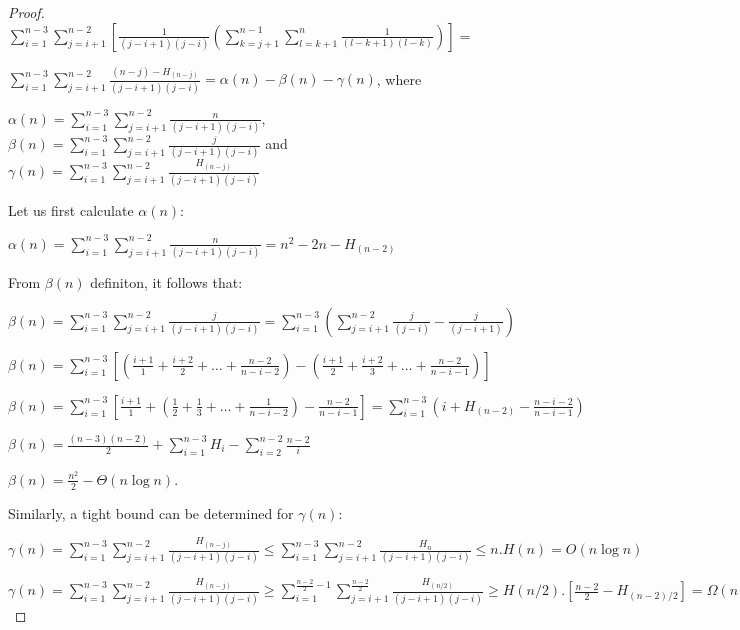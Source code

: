 \documentclass[12pt,letterpaper]{article}
\begin{document}
\begin{proof}
$\sum\limits_{i=1}^{n-3} \sum\limits_{j=i+1}^{n-2}  \left[ \frac{1}{(j-i+1)(j-i)}
\left( \sum\limits_{k=j+1}^{n-1} \sum\limits_{l=k+1}^{n} \frac{1}{(l-k+1)(l-k)} \right) \right] =  $

$\sum\limits_{i=1}^{n-3} \sum\limits_{j=i+1}^{n-2} \frac{(n - j) - H_{(n - j)}} {(j-i+1)(j-i)} 
= \alpha(n) - \beta(n) - \gamma(n)$, where

$\alpha(n) = \sum\limits_{i=1}^{n-3} \sum\limits_{j=i+1}^{n-2} \frac{n} {(j-i+1)(j-i)}$,
$\beta(n) = \sum\limits_{i=1}^{n-3} \sum\limits_{j=i+1}^{n-2} \frac{j} {(j-i+1)(j-i)}$ and 
$\gamma(n) =  \sum\limits_{i=1}^{n-3} \sum\limits_{j=i+1}^{n-2} \frac{H_{(n - j)}} {(j-i+1)(j-i)}$

Let us first calculate $\alpha(n)$:

$\alpha(n) = \sum\limits_{i=1}^{n-3} \sum\limits_{j=i+1}^{n-2} \frac{n} {(j-i+1)(j-i)}
= n^2 - 2n - H_{(n-2)}$

From $\beta(n)$ definiton, it follows that:

$\beta(n) = \sum\limits_{i=1}^{n-3} \sum\limits_{j=i+1}^{n-2} \frac{j} {(j-i+1)(j-i)}
= \sum\limits_{i=1}^{n-3} \left( \sum\limits_{j=i+1}^{n-2} \frac{j}{(j-i)} - \frac{j} {(j-i+1)} \right)$

$\beta(n) = \sum\limits_{i=1}^{n-3} \left[ \left( \frac{i+1}{1} +  \frac{i+2}{2} + \ldots + \frac{n-2}{n-i-2} \right)
- \left( \frac{i+1}{2} +  \frac{i+2}{3} + \ldots + \frac{n-2}{n-i-1} \right) \right]$

$\beta(n) = \sum\limits_{i=1}^{n-3} \left[
\frac{i+1}{1}  + \left( \frac{1}{2} +  \frac{1}{3} + \ldots + \frac{1}{n-i-2} \right)
- \frac{n-2}{n-i-1} \right]
= \sum\limits_{i=1}^{n-3} \left( i + H_{(n-2)} - \frac{n-i-2}{n-i-1} \right)$

$\beta(n) = \frac{(n-3)(n-2)}{2} + \sum\limits_{i=1}^{n-3} H_{i} - \sum\limits_{i=2}^{n-2} \frac{n-2}{i}$

$\beta(n) = \frac{n^2}{2} - \Theta(n \log n)$.

Similarly, a tight bound can be determined for $\gamma(n)$:

$\gamma(n) =  \sum\limits_{i=1}^{n-3} \sum\limits_{j=i+1}^{n-2} \frac{H_{(n - j)}} {(j-i+1)(j-i)}
\leq  \sum\limits_{i=1}^{n-3} \sum\limits_{j=i+1}^{n-2} \frac{H_{n}} {(j-i+1)(j-i)}
\leq  n . H(n) = O(n \log n) $

$\gamma(n) =  \sum\limits_{i=1}^{n-3} \sum\limits_{j=i+1}^{n-2} \frac{H_{(n - j)}} {(j-i+1)(j-i)}
\geq  \sum\limits_{i=1}^{\frac{n-2}{2} - 1} \sum\limits_{j=i+1}^{\frac{n-2}{2}} \frac{H_{(n/2)}} {(j-i+1)(j-i)}
\geq  H(n/2) . \left[\frac{n-2}{2} - H_{(n-2)/2} \right] = \Omega(n \log n) $


\end{proof}
\end{document}
